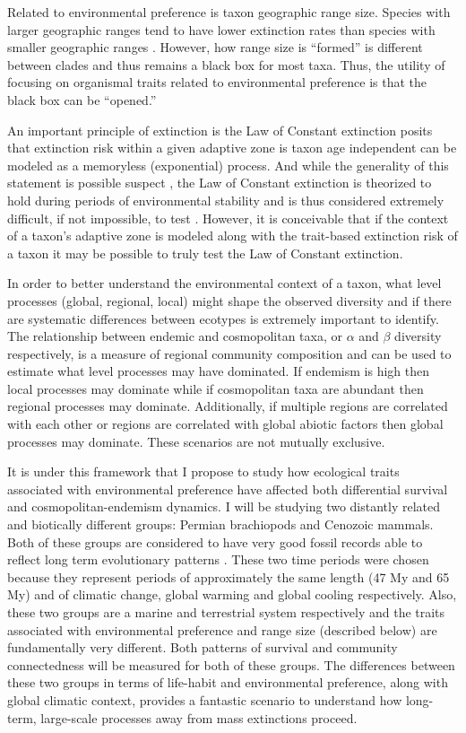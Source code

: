 \documentclass[12pt,letterpaper]{article}
\begin{document}
Related to environmental preference is taxon geographic range size. Species with larger geographic ranges tend to have lower extinction rates than species with smaller geographic ranges \citep{Jablonski1986,Harnik2013,Nurnberg2013a,Jablonski2003,Roy2009c}. However, how range size is ``formed'' is different between clades \citep{Jablonski1987} and thus remains a black box for most taxa. Thus, the utility of focusing on organismal traits related to environmental preference is that the black box can be ``opened.''

An important principle of extinction is the Law of Constant extinction \citep{VanValen1973} posits that extinction risk within a given adaptive zone is taxon age independent can be modeled as a memoryless (exponential) process. And while the generality of this statement is possible suspect \citep{Drake2014,Raup1975,Sepkoski1975,Finnegan2008,Raup1991a}, the Law of Constant extinction is theorized to hold during periods of environmental stability and is thus considered extremely difficult, if not impossible, to test \citep{Liow2011a}. However, it is conceivable that if the context of a taxon's adaptive zone is modeled along with the trait-based extinction risk of a taxon it may be possible to truly test the Law of Constant extinction.

In order to better understand the environmental context of a taxon, what level processes (global, regional, local) might shape the observed diversity and if there are systematic differences between ecotypes is extremely important to identify. The relationship between endemic and cosmopolitan taxa, or \(\alpha\) and \(\beta\) diversity respectively, is a measure of regional community composition and can be used to estimate what level processes may have dominated. If endemism is high then local processes may dominate while if cosmopolitan taxa are abundant then regional processes may dominate. Additionally, if multiple regions are correlated with each other or regions are correlated with global abiotic factors then global processes may dominate. These scenarios are not mutually exclusive. 

It is under this framework that I propose to study how ecological traits associated with environmental preference have affected both differential survival and cosmopolitan-endemism dynamics. I will be studying two distantly related and biotically different groups: Permian brachiopods and Cenozoic mammals. Both of these groups are considered to have very good fossil records able to reflect long term evolutionary patterns \citep{Mark1977}. These two time periods were chosen because they represent periods of approximately the same length (47 My and 65 My) and of climatic change, global warming and global cooling respectively. Also, these two groups are a marine and terrestrial system respectively and the traits associated with environmental preference and range size (described below) are fundamentally very different. Both patterns of survival and community connectedness will be measured for both of these groups. The differences between these two groups in terms of life-habit and environmental preference, along with global climatic context, provides a fantastic scenario to understand how long-term, large-scale processes away from mass extinctions proceed.
\end{document}
